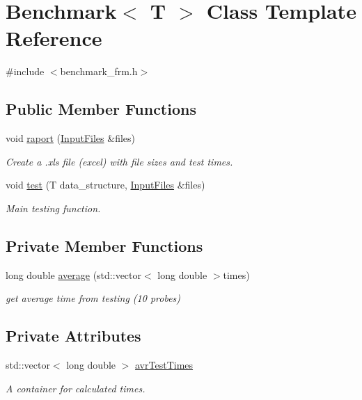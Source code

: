 \hypertarget{class_benchmark}{}\section{Benchmark$<$ T $>$ Class Template Reference}
\label{class_benchmark}


{\ttfamily \#include $<$benchmark\+\_\+frm.\+h$>$}

\subsection*{Public Member Functions}
\begin{DoxyCompactItemize}
\item 
void \hyperlink{class_benchmark_a8985652680b36c2416d30e39b1ec7918}{raport} (\hyperlink{class_input_files}{Input\+Files} \&files)
\begin{DoxyCompactList}\small\item\em Create a .xls file (excel) with file sizes and test times. \end{DoxyCompactList}\item 
void \hyperlink{class_benchmark_a2cd457b30f1756d063eff2e1df375c4c}{test} (T data\+\_\+structure, \hyperlink{class_input_files}{Input\+Files} \&files)
\begin{DoxyCompactList}\small\item\em Main testing function. \end{DoxyCompactList}\end{DoxyCompactItemize}
\subsection*{Private Member Functions}
\begin{DoxyCompactItemize}
\item 
long double \hyperlink{class_benchmark_a9a1fec8387a129f1212645121ab81f44}{average} (std\+::vector$<$ long double $>$times)
\begin{DoxyCompactList}\small\item\em get average time from testing (10 probes) \end{DoxyCompactList}\end{DoxyCompactItemize}
\subsection*{Private Attributes}
\begin{DoxyCompactItemize}
\item 
std\+::vector$<$ long double $>$ \hyperlink{class_benchmark_a9bfca8010e678170e36a44dd9e83661f}{avr\+Test\+Times}
\begin{DoxyCompactList}\small\item\em A container for calculated times. \end{DoxyCompactList}\end{DoxyCompactItemize}


